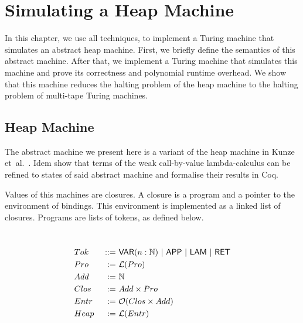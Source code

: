 \chapter{Simulating a Heap Machine}
\label{chap:heap}

In this chapter, we use all techniques, to implement a Turing machine that simulates an abstract heap machine.  First, we briefly define the semantics
of this abstract machine.  After that, we implement a Turing machine that simulates this machine and prove its correctness and polynomial runtime
overhead.  We show that this machine reduces the halting problem of the heap machine to the halting problem of multi-tape Turing machines.

\section{Heap Machine}
\label{sec:heap-def}

The abstract machine we present here is a variant of the heap machine in Kunze et~al.~\cite{KunzeEtAl:2018:Formal}.  Idem show that terms of the weak
call-by-value lambda-calculus can be refined to states of said abstract machine and formalise their results in Coq.

Values of this machines are closures.  A closure is a program and a pointer to the environment of bindings.  This environment is implemented as a
linked list of closures.  Programs are lists of tokens, as defined below.
\begin{definition}
  ~
  \begin{alignat*}{2}
    &Tok  &~::=~& \mathsf{VAR}(n:\mathbb{N}) ~|~ \mathsf{APP} ~|~ \mathsf{LAM} ~|~ \mathsf{RET} \\
    &Pro  &~:=~& \mathcal{L}(Pro) \\
    &Add  &~:=~& \mathbb{N} \\
    &Clos &~:=~& Add \times Pro \\
    &Entr &~:=~& \mathcal{O}(Clos \times Add) \\
    &Heap &~:=~& \mathcal{L}(Entr)
  \end{alignat*}
\end{definition}

